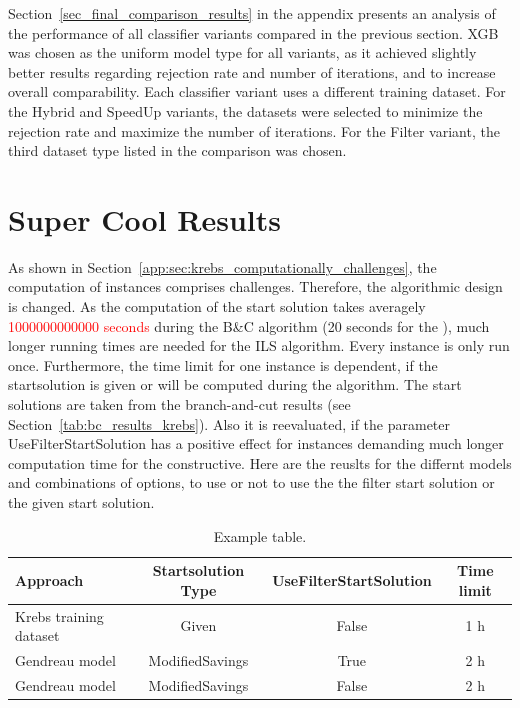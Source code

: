 Section~\ref{sec_final_comparison_results} in the appendix presents an analysis of the performance of all classifier variants compared
in the previous section. \gls{XGB} was chosen as the uniform model type for all variants, as it achieved slightly better results
regarding rejection rate and number of iterations, and to increase overall comparability.
Each classifier variant uses a different training dataset. For the Hybrid and SpeedUp variants,
the datasets were selected to minimize the rejection rate and maximize the number of iterations. For the Filter variant,
the third dataset type listed in the comparison was chosen.



\section{Super Cool Results}
\label{sec:results_krebs}
As shown in Section~\ref{app:sec:krebs_computationally_challenges}, the computation of \krebsADataSetText instances comprises
challenges. Therefore, the algorithmic design is changed. As the computation of the start solution takes averagely \textcolor{red}{1000000000000 seconds}
during the B\&C algorithm (20 seconds for the \gendreauDataSetText), much longer running times are needed for the \gls{ILS} algorithm.
Every instance is only run once. Furthermore, the time limit for one instance
is dependent, if the startsolution is given or will be computed during the algorithm. The start solutions are taken from the branch-and-cut
results (see Section~\ref{tab:bc_results_krebs}). Also it is reevaluated, if the parameter UseFilterStartSolution has a positive effect
for instances demanding much longer computation time for the constructive.
\parbreak
Here are the reuslts for the differnt models and combinations of options, to use or not to use the the filter start solution or the given start solution.

\begin{table}[ht]
    \centering
    \begin{tabular}{l c c c }
        \toprule
        Approach               & Startsolution Type & UseFilterStartSolution & Time limit \\
        \midrule
        Krebs training dataset & Given              & False                  & 1 h        \\
        Gendreau model         & ModifiedSavings    & True                   & 2 h        \\
        Gendreau model         & ModifiedSavings    & False                  & 2 h        \\
        \bottomrule
    \end{tabular}
    \caption{Example table.}
\end{table}
